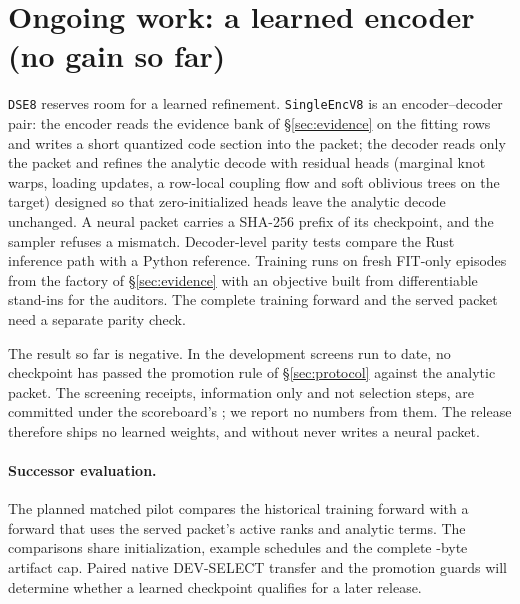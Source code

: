 \section{Ongoing work: a learned encoder (no gain so far)}\label{sec:learned}

\texttt{DSE8} reserves room for a learned refinement.
\texttt{SingleEncV8} is an encoder--decoder pair: the encoder reads the evidence bank of \S\ref{sec:evidence} on the fitting rows and writes a short quantized code section into the packet; the decoder reads only the packet and refines the analytic decode with residual heads (marginal knot warps, loading updates, a row-local coupling flow and soft oblivious trees on the target) designed so that zero-initialized heads leave the analytic decode unchanged.
A neural packet carries a SHA-256 prefix of its checkpoint, and the sampler refuses a mismatch.
Decoder-level parity tests compare the Rust inference path with a Python reference. Training runs on fresh FIT-only episodes from the factory of \S\ref{sec:evidence} with an objective built from differentiable stand-ins for the auditors. The complete training forward and the served packet need a separate parity check.

The result so far is negative.
In the development screens run to date, no checkpoint has passed the promotion rule of \S\ref{sec:protocol} against the analytic packet.
The screening receipts, information only and not selection steps, are committed under the scoreboard's ; we report no numbers from them.
The release therefore ships no learned weights, and  without  never writes a neural packet.

\paragraph{Successor evaluation.}
The planned matched pilot compares the historical training forward with a forward that uses the served packet's active ranks and analytic terms. The comparisons share initialization, example schedules and the complete -byte artifact cap. Paired native DEV-SELECT transfer and the promotion guards will determine whether a learned checkpoint qualifies for a later release.
